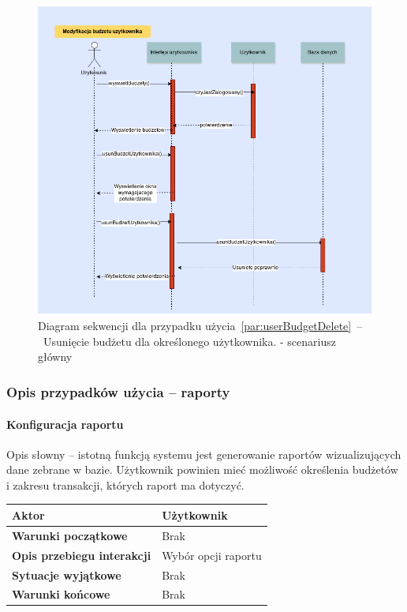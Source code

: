 \begin{figure}[H]
    \includegraphics[width=\textwidth,
    height=0.5\textheight]{images/usun_budzet_uzytkownika.png}
    \caption{Diagram sekwencji dla przypadku użycia~\ref{par:userBudgetDelete}~--~Usunięcie budżetu dla określonego użytkownika.
    - scenariusz główny}
\end{figure}

\subsubsection{Opis przypadków użycia -- raporty}
\paragraph{Konfiguracja raportu\newline}
\label{par:reportConfig}
Opis słowny -- istotną funkcją systemu jest generowanie raportów wizualizujących dane zebrane w bazie. Użytkownik powinien mieć możliwość określenia budżetów i zakresu transakcji, których raport ma dotyczyć.

\begin{longtable}{|p{5cm}|p{7cm}|}
 	\hline
	\textbf{Aktor} & Użytkownik \\
	\hline
	\textbf{Warunki początkowe} & Brak \\
	\hline
	\textbf{Opis przebiegu interakcji} & Wybór opcji raportu \\
	\hline
	\textbf{Sytuacje wyjątkowe} & Brak \\
	\hline
	\textbf{Warunki końcowe} & Brak \\
	\hline
\end{longtable}


